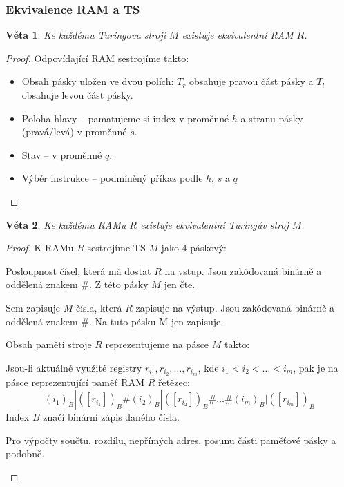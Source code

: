\documentclass[11pt]{report} %
\newtheorem{theorem}{Věta}[section]
\begin{document}
\subsubsection{Ekvivalence RAM a TS}
\begin{theorem}
	Ke každému Turingovu stroji $M$ existuje ekvivalentní RAM $R$.
\end{theorem}
\begin{proof}
	Odpovídající RAM sestrojíme takto:
	\begin{itemize}
		\leftskip 20pt
		\setlength{\itemsep}{0pt}
		\item Obsah pásky uložen ve dvou polích: $T_r$ obsahuje pravou část pásky a $T_l$ obsahuje levou část pásky.
		\item Poloha hlavy – pamatujeme si index v proměnné $h$ a stranu pásky (pravá/levá) v proměnné $s$.
		\item Stav – v proměnné $q$.
		\item Výběr instrukce – podmíněný příkaz podle $h$, $s$ a $q$		
	\end{itemize}

\end{proof}


\begin{theorem}
Ke každému RAMu $R$ existuje ekvivalentní Turingův stroj $M$.
\end{theorem}
\begin{proof}
	K RAMu $R$ sestrojíme TS $M$ jako 4-páskový:
	\begin{description}
		\leftskip 40pt
		\setlength{\itemsep}{0pt}
		
		\item[Vstupní páska] Posloupnost čísel, která má dostat $R$ na vstup. Jsou zakódovaná binárně a oddělená znakem $\#$. Z této pásky $M$ jen čte.
		\item[Výstupní páska] Sem zapisuje $M$ čísla, která $R$ zapisuje na výstup. Jsou zakódovaná binárně a oddělená znakem $\#$. Na tuto pásku M jen zapisuje.
		\item[Paměť RAM] Obsah paměti stroje $R$ reprezentujeme na pásce $M$ takto:

		Jsou-li aktuálně využité registry $r_{i_1}, r_{i_2}, \dots, r_{i_m}$, kde $i_1 <
		i_2 < \dots < i_m$, pak je na pásce reprezentující paměť RAM $R$ řetězec:
		$$(i_1)_B|([r_{i_1}])_B\#(i_2)_B|([r_{i_2}])_B\#\dots\#(i_m)_B|([r_{i_m}])_B$$
		Index $B$ značí binární zápis daného čísla.
		\item[Pomocná páska] Pro výpočty součtu, rozdílu, nepřímých adres, posunu části paměťové pásky a podobně.
	\end{description}

\end{proof}
\end{document}
